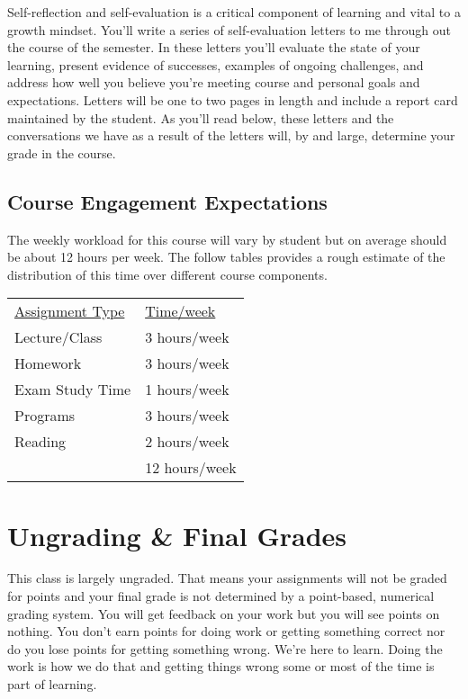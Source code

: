 \documentclass[10pt]{article}
\begin{document}
Self-reflection and self-evaluation is a critical component of learning and vital to a growth mindset. You'll write a series of self-evaluation letters to me through out the course of the semester. In these letters you'll evaluate the state of your learning, present evidence of successes, examples of ongoing challenges, and address how well you believe you're meeting course and personal goals and expectations. Letters will be one to two pages in length and include a report card maintained by the student. As you'll read below, these letters and the conversations we have as a result of the letters will, by and large, determine your grade in the course.


\subsection{Course Engagement Expectations}

The weekly workload for this course will vary by student but on average should be about 12 hours per week.  The follow tables provides a rough estimate of the distribution of this time over different course components.
\begin{center}
\begin{tabular}{ll}
\underline{Assignment Type} & \underline{Time/week} \\
Lecture/Class      & 3 hours/week \\
Homework          & 3 hours/week \\
Exam Study Time    & 1 hours/week \\
Programs          & 3 hours/week \\
Reading &  2 hours/week \\
\bottomrule
 & 12 hours/week
\end{tabular}
\end{center}


\section{Ungrading \& Final Grades}

This class is largely ungraded. That means your assignments will not be graded for points and your final grade is not determined by a point-based, numerical grading system. You will get feedback on your work but you will see points on nothing. You don't earn points for doing work or getting something correct nor do you lose points for getting something wrong. We're here to learn. Doing the work is how we do that and getting things wrong some or most of the time is part of learning.
\end{document}

